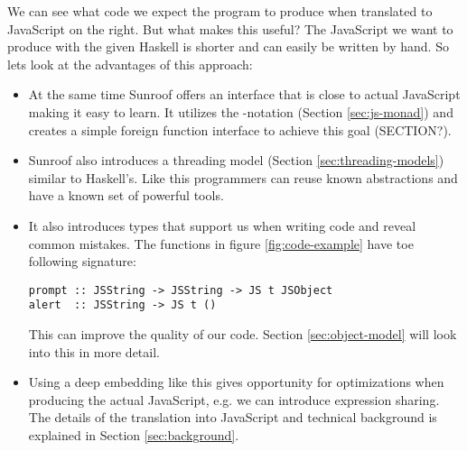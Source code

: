 We can see what code we expect the program to produce when 
translated to JavaScript on the right. But what makes 
this useful? The JavaScript we want to produce with the given
Haskell is shorter and can easily be written by hand.
So lets look at the advantages of this approach:
\begin{itemize}

\item
At the same time Sunroof offers an interface that is 
close to actual JavaScript making it easy to learn.
It utilizes the -notation (Section \ref{sec:js-monad}) and creates a 
simple foreign function interface to achieve this goal (SECTION?).

\item
Sunroof also introduces a threading model (Section \ref{sec:threading-models}) similar
to Haskell's. Like this programmers can reuse known abstractions
and have a known set of powerful tools.

\item 
It also introduces types that support us when 
writing code and reveal common mistakes. The functions
in figure \ref{fig:code-example} have toe following signature:
\begin{verbatim}
prompt :: JSString -> JSString -> JS t JSObject
alert  :: JSString -> JS t ()
\end{verbatim}
This can improve the quality of our code.
Section \ref{sec:object-model} will look into this in more detail.

\item 
Using a deep embedding like this gives opportunity 
for optimizations when producing the actual JavaScript,
e.g. we can introduce expression sharing.
The details of the translation into JavaScript and
technical background is explained in Section \ref{sec:background}.





\end{itemize}


